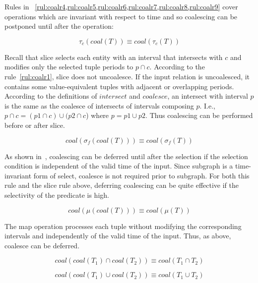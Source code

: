 Rules in
~\cref{rul:coalr4,rul:coalr5,rul:coalr6,rul:coalr7,rul:coalr8,rul:coalr9}
cover operations which are invariant with respect to time and so
coalescing can be postponed until after the operation:

\begin{equation}
\tau_c(coal(T)) \equiv coal(\tau_c(T))
\label{rul:coalr4}
\end{equation}

Recall that slice selects each entity with an interval that intersects
with $c$ and modifies only the selected tuple periods to $p \cap c$.
According to the rule~\ref{rul:coalr1}, slice does not uncoalesce.  If
the input relation is uncoalesced, it contains some value-equivalent
tuples with adjacent or overlapping periods.  According to the
definitions of $intersect$ and $coalesce$, an intersect with interval
$p$ is the same as the coalesce of intersects of intervals composing
$p$.  I.e., $p \cap c = (p1 \cap c) \cup (p2 \cap c$) where $p = p1
\cup p2$.  Thus coalescing can be performed before or after slice.

\begin{equation}
coal(\sigma_f(coal(T))) \equiv coal(\sigma_f(T))
\label{rul:coalr5}
\end{equation}

As shown in~\cite{DBLP:conf/vldb/BohlenSS96}, coalescing can be
deferred until after the selection if the selection condition is
independent of the valid time of the input. Since subgraph is a
time-invariant form of select, coalesce is not required prior to
subgraph.  For both this rule and the slice rule above, deferring
coalescing can be quite effective if the selectivity of the predicate
is high.

\begin{equation}
coal(\mu(coal(T))) \equiv coal(\mu(T))
\label{rul:coalr6}
\end{equation}

The map operation processes each tuple without modifying the
corresponding intervals and independently of the valid time of the
input.  Thus, as above, coalesce can be deferred.

\begin{equation}
coal(coal(T_1) \cap coal(T_2)) \equiv coal(T_1 \cap T_2)
\label{rul:coalr7}
\end{equation}

\begin{equation}
coal(coal(T_1) \cup coal(T_2)) \equiv coal(T_1 \cup T_2)
\label{rul:coalr8}
\end{equation}

